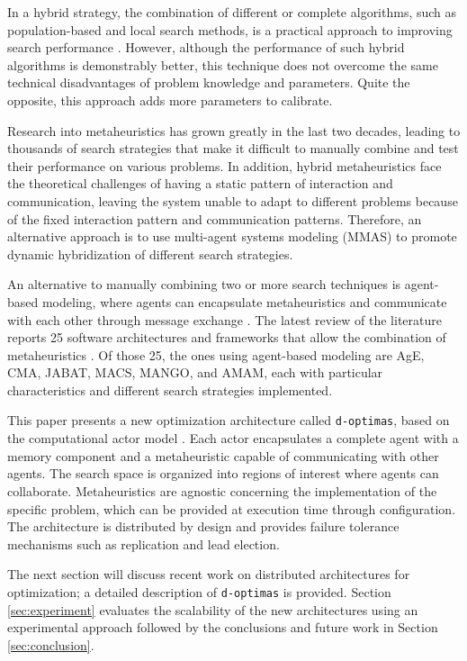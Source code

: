 \documentclass[preprint,12pt]{elsarticle}
\begin{document}
In a hybrid strategy, the combination of different or complete algorithms, such as population-based and local search methods, is a practical approach to improving search performance \cite{dokeroglu2019}. However, although the performance of such hybrid algorithms is demonstrably better, this technique does not overcome the same technical disadvantages of problem knowledge and parameters. Quite the opposite, this approach adds more parameters to calibrate.

Research into metaheuristics has grown greatly in the last two decades, leading to thousands of search strategies that make it difficult to manually combine and test their performance on various problems. In addition, hybrid metaheuristics face the theoretical challenges of having a static pattern of interaction and communication, leaving the system unable to adapt to different problems because of the fixed interaction pattern and communication patterns. Therefore, an alternative approach is to use multi-agent systems modeling (MMAS) to promote dynamic hybridization of different search strategies.

An alternative to manually combining two or more search techniques is agent-based modeling, where agents can encapsulate metaheuristics and communicate with each other through message exchange \cite{gong2015, zheng2015}. The latest review of the literature reports 25 software architectures and frameworks that allow the combination of metaheuristics \cite{silva2018}. Of those 25, the ones using agent-based modeling are AgE, CMA, JABAT, MACS, MANGO, and AMAM, each with particular characteristics and different search strategies implemented. 

This paper presents a new optimization architecture called \texttt{d-optimas}, based on the computational actor model \cite{hewitt2013}. Each actor encapsulates a complete agent with a memory component and a metaheuristic capable of communicating with other agents. The search space is organized into regions of interest where agents can collaborate. Metaheuristics are agnostic concerning the implementation of the specific problem, which can be provided at execution time through configuration. The architecture is distributed by design and provides failure tolerance mechanisms such as replication and lead election. 

The next section will discuss recent work on distributed architectures for optimization; a detailed description of \texttt{d-optimas} is provided. Section \ref{sec:experiment} 
 evaluates the scalability of the new architectures using an experimental approach followed by the conclusions and future work in Section \ref{sec:conclusion}. 
\end{document}
